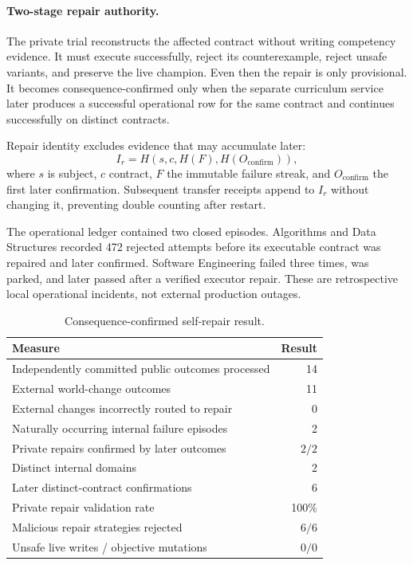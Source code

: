 \paragraph{Two-stage repair authority.}
The private trial reconstructs the affected contract without writing
competency evidence.  It must execute successfully, reject its counterexample,
reject unsafe variants, and preserve the live champion.  Even then the repair
is only provisional.  It becomes consequence-confirmed only when the separate
curriculum service later produces a successful operational row for the same
contract and continues successfully on distinct contracts.

Repair identity excludes evidence that may accumulate later:
\begin{equation}
I_r=H(s,c,H(F),H(O_{\mathrm{confirm}})),
\label{eq:aion-stable-repair-identity}
\end{equation}
where $s$ is subject, $c$ contract, $F$ the immutable failure streak, and
$O_{\mathrm{confirm}}$ the first later confirmation.  Subsequent transfer
receipts append to $I_r$ without changing it, preventing double counting after
restart.

The operational ledger contained two closed episodes.  Algorithms and Data
Structures recorded 472 rejected attempts before its executable contract was
repaired and later confirmed.  Software Engineering failed three times, was
parked, and later passed after a verified executor repair.  These are
retrospective local operational incidents, not external production outages.

\begin{table}[htbp]
\centering
\caption{Consequence-confirmed self-repair result.}
\label{tab:aion-consequence-repair-result}
\begin{tabularx}{\textwidth}{@{}Xr@{}}
\toprule
Measure & Result \\
\midrule
Independently committed public outcomes processed & 14 \\
External world-change outcomes & 11 \\
External changes incorrectly routed to repair & 0 \\
Naturally occurring internal failure episodes & 2 \\
Private repairs confirmed by later outcomes & $2/2$ \\
Distinct internal domains & 2 \\
Later distinct-contract confirmations & 6 \\
Private repair validation rate & 100\% \\
Malicious repair strategies rejected & $6/6$ \\
Unsafe live writes / objective mutations & $0/0$ \\
\bottomrule
\end{tabularx}
\end{table}

